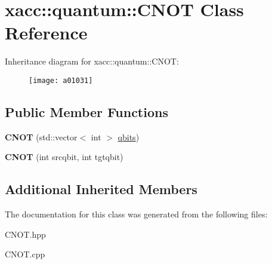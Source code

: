 \hypertarget{a01031}{}\section{xacc\+:\+:quantum\+:\+:C\+N\+OT Class Reference}
\label{a01031}
Inheritance diagram for xacc\+:\+:quantum\+:\+:C\+N\+OT\+:\begin{figure}[H]
\begin{center}
\leavevmode
\texttt{[image: a01031]}
\end{center}
\end{figure}
\subsection*{Public Member Functions}
\begin{DoxyCompactItemize}
\item 
\mbox{\label{a01031_ad3d460779a27affa317dd4f3a88268b3}} 
{\bfseries C\+N\+OT} (std\+::vector$<$ int $>$ \hyperlink{a01015_a2a56be6c2519ea65df4d06f4abae1393}{qbits})
\item 
\mbox{\label{a01031_a15efcb44477dde4b6151fe1776a73ddc}} 
{\bfseries C\+N\+OT} (int srcqbit, int tgtqbit)
\end{DoxyCompactItemize}
\subsection*{Additional Inherited Members}


The documentation for this class was generated from the following files\+:\begin{DoxyCompactItemize}
\item 
C\+N\+O\+T.\+hpp\item 
C\+N\+O\+T.\+cpp\end{DoxyCompactItemize}
